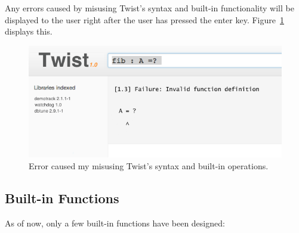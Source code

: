 Any errors caused by misusing Twist's syntax and built-in functionality will be displayed to the user right after the user has pressed the enter key. Figure~\ref{fig:error} displays this.

\begin{figure}[!ht]
    \centering
    \includegraphics[width=\textwidth]{images/error}
    \caption{Error caused my misusing Twist's syntax and built-in operations.}
    \label{fig:error}
\end{figure}

\subsection{Built-in Functions}
\label{sec:functions}
 
As of now, only a few built-in functions have been designed:

